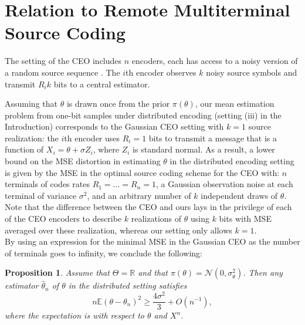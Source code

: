 \documentclass[letterpaper, conference,9pt]{IEEEtran}      %
\newtheorem{prop}[thm]{\bf {Proposition}}
\begin{document}
\section{Relation to Remote Multiterminal Source Coding \label{sec:ceo}}
The setting of the CEO includes $n$ encoders, each has access to a noisy version of a random source sequence \cite{berger1996ceo}. 
The $i$th encoder observes $k$ noisy source symbols and transmit $R_i k$ bits to a central estimator. \par
Assuming that $\theta$ is drawn once from the prior $\pi(\theta)$, our mean estimation problem from one-bit samples under distributed encoding (setting (iii) in the Introduction) corresponds to the Gaussian CEO setting with $k=1$ source realization: the $i$th encoder uses $R_i=1$ bits to transmit a message that is a function of $X_i = \theta + \sigma Z_i$, where $Z_i$ is standard normal. As a result, a lower bound on the MSE distortion in estimating $\theta$ in the distributed encoding setting is given by the MSE in the optimal source coding scheme for the CEO with: $n$ terminals of codes rates $R_1 = \ldots = R_n = 1$, a Gaussian observation noise at each terminal of variance $\sigma^2$, and an arbitrary number of $k$ independent draws of $\theta$. Note that the difference between the CEO and ours lays in the privilege of each of the CEO encoders to describe $k$ realizations of $\theta$ using $k$ bits with MSE averaged over these realization, whereas our setting only allows $k=1$. 
 \\

By using an expression for the minimal MSE in the Gaussian CEO as the number of terminals goes to infinity, we conclude the following:
\begin{prop} \label{prop:ceo_lower_bound}
Assume that $\Theta = \mathbb R$ and that $\pi(\theta) = \mathcal N(0,\sigma_\theta^2)$. Then any estimator $\widehat{\theta}_n$ of $\theta$ in the distributed setting satisfies
\begin{equation} \label{eq:ceo_bound}
 n\mathbb E \left( \theta - \theta_n \right)^2 \geq \frac{4\sigma^2}{3} + O(n^{-1}),
\end{equation}
where the expectation is with respect to $\theta$ and $X^n$.
\end{prop}
\end{document}
